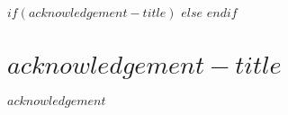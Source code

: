 $if(acknowledgement-title)$
\newcommand{\acknowledgementtitle}{$acknowledgement-title$}
$else$
\newcommand{\acknowledgementtitle}{Acknowledgement}
$endif$
\thispagestyle{plain}
\chapter*{\acknowledgementtitle}
$acknowledgement$
\cleardoublepage

